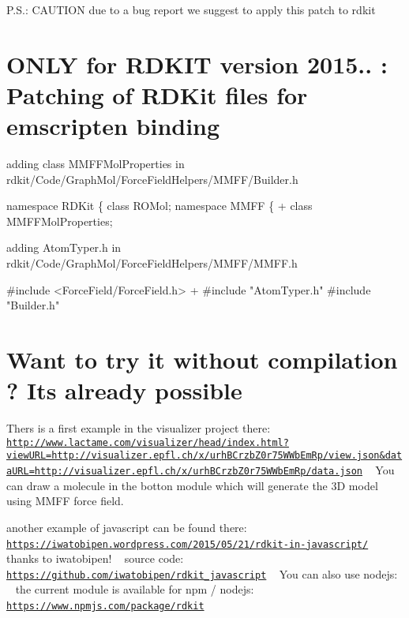 P.\+S.\+: C\+A\+U\+T\+I\+ON due to a bug report we suggest to apply this patch to rdkit

\section*{O\+N\+LY for R\+D\+K\+IT version 2015.. \+: Patching of R\+D\+Kit files for emscripten binding }


\begin{DoxyItemize}
\item adding class M\+M\+F\+F\+Mol\+Properties in rdkit/\+Code/\+Graph\+Mol/\+Force\+Field\+Helpers/\+M\+M\+F\+F/\+Builder.\+h 
\begin{DoxyCode}
  namespace RDKit \{
    class ROMol;
    namespace MMFF \{
+     class MMFFMolProperties;
\end{DoxyCode}

\item adding Atom\+Typer.\+h in rdkit/\+Code/\+Graph\+Mol/\+Force\+Field\+Helpers/\+M\+M\+F\+F/\+M\+M\+F\+F.\+h 
\begin{DoxyCode}
  #include <ForceField/ForceField.h>
+ #include "AtomTyper.h"
  #include "Builder.h"
\end{DoxyCode}

\end{DoxyItemize}

\section*{Want to try it without compilation ? It\textquotesingle{}s already possible }

Thers is a first example in the visualizer project there\+: ~\newline
 \href{http://www.lactame.com/visualizer/head/index.html?viewURL=http://visualizer.epfl.ch/x/urhBCrzbZ0r75WWbEmRp/view.json&dataURL=http://visualizer.epfl.ch/x/urhBCrzbZ0r75WWbEmRp/data.json}{\tt http\+://www.\+lactame.\+com/visualizer/head/index.\+html?view\+U\+R\+L=http\+://visualizer.\+epfl.\+ch/x/urh\+B\+Crzb\+Z0r75\+W\+Wb\+Em\+Rp/view.\+json\&data\+U\+R\+L=http\+://visualizer.\+epfl.\+ch/x/urh\+B\+Crzb\+Z0r75\+W\+Wb\+Em\+Rp/data.\+json} ~\newline
 You can draw a molecule in the botton module which will generate the 3D model using M\+M\+FF force field.

another example of javascript can be found there\+: ~\newline
\href{https://iwatobipen.wordpress.com/2015/05/21/rdkit-in-javascript/}{\tt https\+://iwatobipen.\+wordpress.\+com/2015/05/21/rdkit-\/in-\/javascript/} ~\newline
thanks to iwatobipen! ~\newline
source code\+: \href{https://github.com/iwatobipen/rdkit_javascript}{\tt https\+://github.\+com/iwatobipen/rdkit\+\_\+javascript} ~\newline
 You can also use nodejs\+: ~\newline
the current module is available for npm / nodejs\+: ~\newline
\href{https://www.npmjs.com/package/rdkit}{\tt https\+://www.\+npmjs.\+com/package/rdkit} ~\newline
